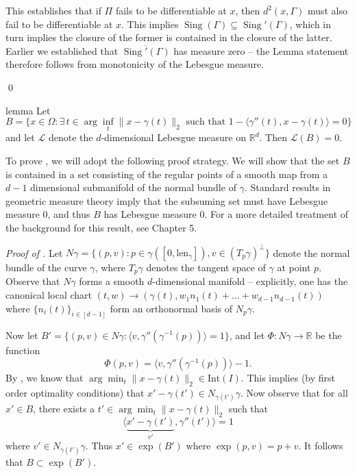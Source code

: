 \documentclass[11pt]{article}
\begin{document}
This establishes that if $\Pi$ fails to be differentiable at $x$, then $d^2(x, \Gamma)$ must also fail to be differentiable at $x$. This implies $\operatorname{Sing}(\Gamma) \subseteq \operatorname{Sing}'(\Gamma)$, which in turn implies the closure of the former is contained in the closure of the latter. Earlier we established that $\overline{\operatorname{Sing}'(\Gamma)}$ has measure zero -- the Lemma statement therefore follows from monotonicity of the Lebesgue measure.

\qed{}

\begin{restatable}{lemma}{} \label{lemma: IFT degen}
    Let
    \begin{equation} 
    B= \{x \in \Omega : \exists \,t \in \arg\inf_t \|x-\gamma(t)\|_2 \text{ such that } 1 - \langle\gamma''(t), x-\gamma(t)\rangle = 0 \} \label{eq: ift degeneracy set}
    \end{equation}
    and let $\mathcal{L}$ denote the $d$-dimensional Lebesgue measure on $\mathbb{R}^d$. Then $\mathcal{L}(B) = 0.$
\end{restatable}
\noindent To prove , we will adopt the following proof strategy. We will show that the set $B$ is contained in a set consisting of the regular points of a smooth map from a $d-1$ dimensional submanifold of the normal bundle of $\gamma$. Standard results in geometric measure theory imply that the subsuming set must have Lebesgue measure $0$, and thus $B$ has Lebesgue measure $0$. For a more detailed treatment of the background for this result, see \citet{lee2003smooth} Chapter 5. 

\textit{Proof of .} Let $N\gamma = \{(p, v) : p \in \gamma([0, \text{len}_{\gamma}]), v \in (T_p \gamma)^{\bot}\}$ denote the normal bundle of the curve $\gamma$, where $T_p\gamma$ denotes the tangent space of $\gamma$ at point $p$. Observe that $N\gamma$ forms a smooth $d$-dimensional manifold -- explicitly, one has the canonical local chart $(t,w) \rightarrow (\gamma(t), w_1n_1(t) + \dots+w_{d-1}n_{d-1}(t))$ where $\{n_i(t)\}_{i\in [d-1]}$ form an orthonormal basis of $N_p\gamma$. 

Now let $B'= \{(p,v) \in N\gamma : \langle v,  \gamma''(\gamma^{-1}(p))\rangle = 1\}$, and let $\Phi:N\gamma \rightarrow \mathbb{R}$ be the function
\[\Phi(p,v) = \langle v, \gamma''(\gamma^{-1}(p))\rangle - 1.\]
By , we know that $\arg \min_t\|x - \gamma(t)\|_2 \in \text{Int}(I)$. This implies (by first order optimality conditions) that $x' - \gamma(t') \in N_{\gamma(t')}\gamma$. Now observe that for all $x' \in B$, there exists a $t' \in \arg\min_t \|x-\gamma(t)\|_2$ such that \[\langle \underbrace{x' - \gamma(t')}_{v'}, \gamma''(t')\rangle = 1\] where $v' \in N_{\gamma(t')}\gamma$. Thus $x' \in \exp(B')$ where $\exp(p,v) = p + v$. It follows that $B\subset \exp(B')$.
\end{document}
